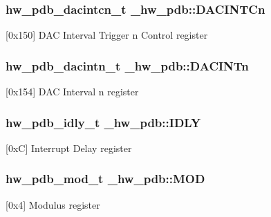 \subsubsection[{\texorpdfstring{D\+A\+C\+I\+N\+T\+Cn}{DACINTCn}}]{ {\bf hw\+\_\+pdb\+\_\+dacintcn\+\_\+t} \+\_\+hw\+\_\+pdb\+::\+D\+A\+C\+I\+N\+T\+Cn}\hypertarget{struct__hw__pdb_a3ebb817d26eb2afe7bf5649d265186f0}{}\label{struct__hw__pdb_a3ebb817d26eb2afe7bf5649d265186f0}
\mbox{[}0x150\mbox{]} D\+AC Interval Trigger n Control register 
\subsubsection[{\texorpdfstring{D\+A\+C\+I\+N\+Tn}{DACINTn}}]{ {\bf hw\+\_\+pdb\+\_\+dacintn\+\_\+t} \+\_\+hw\+\_\+pdb\+::\+D\+A\+C\+I\+N\+Tn}\hypertarget{struct__hw__pdb_a445262c1560c3741f71dbb256688191a}{}\label{struct__hw__pdb_a445262c1560c3741f71dbb256688191a}
\mbox{[}0x154\mbox{]} D\+AC Interval n register 
\subsubsection[{\texorpdfstring{I\+D\+LY}{IDLY}}]{ {\bf hw\+\_\+pdb\+\_\+idly\+\_\+t} \+\_\+hw\+\_\+pdb\+::\+I\+D\+LY}\hypertarget{struct__hw__pdb_af46f675018d92896d7999c03f2849a9a}{}\label{struct__hw__pdb_af46f675018d92896d7999c03f2849a9a}
\mbox{[}0xC\mbox{]} Interrupt Delay register 
\subsubsection[{\texorpdfstring{M\+OD}{MOD}}]{ {\bf hw\+\_\+pdb\+\_\+mod\+\_\+t} \+\_\+hw\+\_\+pdb\+::\+M\+OD}\hypertarget{struct__hw__pdb_a8c9f4083784a5a9ecf7afa5d15ec26f5}{}\label{struct__hw__pdb_a8c9f4083784a5a9ecf7afa5d15ec26f5}
\mbox{[}0x4\mbox{]} Modulus register 
